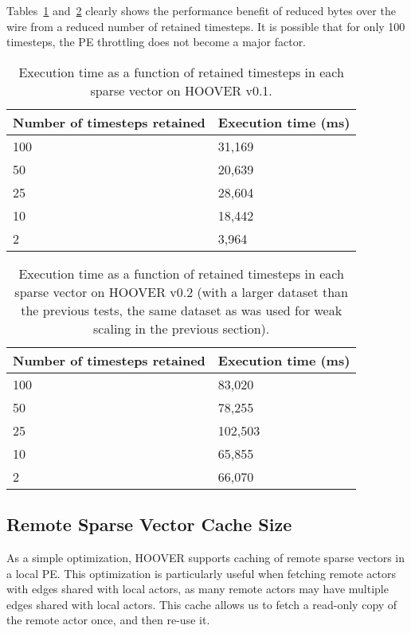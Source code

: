 Tables~\ref{tab:timesteps_retained1} and~\ref{tab:timesteps_retained2} clearly shows the performance benefit of
reduced bytes over the wire from a reduced number of retained timesteps. It is
possible that for only 100 timesteps, the PE throttling does not become a major
factor.

\begin{table}
\centering
\begin{tabularx}{\textwidth}{ | X | X | }
\hline
Number of timesteps retained & Execution time (ms) \\\hline
100 & 31,169 \\\hline
50  & 20,639 \\\hline
25  & 28,604 \\\hline
10  & 18,442 \\\hline
2   & 3,964 \\\hline
\end{tabularx}
\caption{Execution time as a function of retained timesteps in each sparse vector on HOOVER v0.1.}
\label{tab:timesteps_retained1}
\end{table}

\begin{table}
\centering
\begin{tabularx}{\textwidth}{ | X | X | }
\hline
Number of timesteps retained & Execution time (ms) \\\hline
100 & 83,020 \\\hline
50  & 78,255 \\\hline
25  & 102,503 \\\hline
10  & 65,855 \\\hline
2   & 66,070 \\\hline
\end{tabularx}
\caption{Execution time as a function of retained timesteps in each sparse
    vector on HOOVER v0.2 (with a larger dataset than the previous tests, the
    same dataset as was used for weak scaling in the previous section).}
\label{tab:timesteps_retained2}
\end{table}

\subsection{Remote Sparse Vector Cache Size}

As a simple optimization, HOOVER supports caching of remote sparse vectors in a
local PE. This optimization is particularly useful when fetching remote actors
with edges shared with local actors, as many remote actors may have multiple
edges shared with local actors. This cache allows us to fetch a read-only copy
of the remote actor once, and then re-use it.

